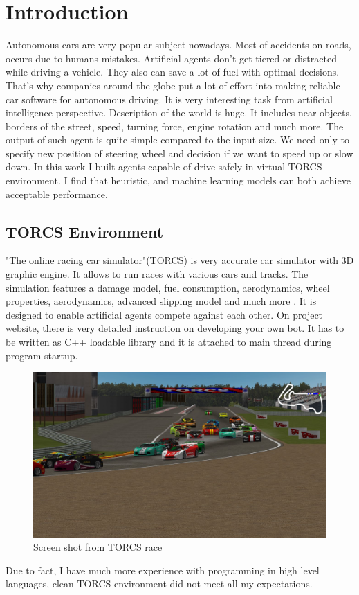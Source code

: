 \documentclass[declaration,shortabstract,english,inz]{iithesis}
\author         {Kacper Kulczak}
\begin{document}


\chapter{Introduction}

Autonomous cars are very popular subject nowadays.
Most of accidents on roads, occurs due to humans mistakes.
Artificial agents don't get tiered or distracted while driving a vehicle.
They also can save a lot of fuel with optimal decisions.
That's why companies around the globe put a lot of effort into making reliable car software for autonomous driving.
It is very interesting task from artificial intelligence perspective. Description of the world is huge.
It includes near objects, borders of the street, speed, turning force, engine rotation and much more.
The output of such agent is quite simple compared to the input size.
We need only to specify new position of steering wheel and decision if we want to speed up or slow down.
In this work  I built agents  capable of drive safely in virtual TORCS environment. I find that heuristic, and machine learning models can both achieve acceptable performance.



\section{TORCS Environment}
"The online racing car simulator"(TORCS) is very accurate car simulator with 3D graphic engine.
It allows to run races with various cars and tracks.
The simulation features a damage model, fuel consumption, aerodynamics, wheel properties, aerodynamics, advanced slipping model and much more \cite{TORCS}.
It is designed to enable artificial agents compete against each other.
On project website, there is very detailed instruction on developing your own bot.
It has to be written as C++ loadable library and it is attached to main thread during program startup.


\begin{figure}[h]
    \includegraphics[width=\linewidth]{img/torcs_look.jpeg}
    \caption{Screen shot from TORCS race \cite{TORCS}}
    \label{fig:torcs}
\end{figure}
Due to fact, I have much more experience with programming in high level languages, clean TORCS environment did not meet all my expectations. 
\end{document}
